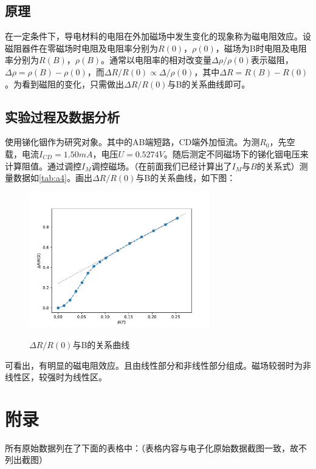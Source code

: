 \documentclass[12pt]{article}
\begin{document}
\subsection{原理}
在一定条件下，导电材料的电阻在外加磁场中发生变化的现象称为磁电阻效应。设磁阻器件在零磁场时电阻及电阻率分别为$R(0)$，$\rho (0)$，磁场为B时电阻及电阻率分别为$R(B)$，$\rho (B)$。通常以电阻率的相对改变量$\Delta \rho / \rho(0)$表示磁阻，$\Delta \rho=\rho(B)−\rho(0)$，而$\Delta R / R(0) \propto \Delta / \rho(0)$，其中$\Delta R=R(B)−R(0)$。为看到磁阻的变化，只需做出$\Delta R / R(0)$与B的关系曲线即可。

\subsection{实验过程及数据分析}
使用锑化铟作为研究对象。其中的AB端短路，CD端外加恒流。为测$R_0$，先空载，电流$I_{CD}=1.50mA$，电压$U=0.5274V$。随后测定不同磁场下的锑化铟电压来计算阻值。通过调控$I_M$调控磁场。（在前面我们已经计算出了$I_M$与$B$的关系式）测量数据如\ref{tab:a4}。画出$\Delta R / R(0)$与B的关系曲线，如下图：

\begin{figure}[H]
    \centering
    \includegraphics[width=0.7\textwidth]{part4.pdf}
    \label{fig:4}
    \caption{$\Delta R / R(0)$与B的关系曲线}
\end{figure}

可看出，有明显的磁电阻效应。且由线性部分和非线性部分组成。磁场较弱时为非线性区，较强时为线性区。

\clearpage

\appendix
\section{附录}
\renewcommand{\thetable}{附表\arabic{table}}
\setcounter{table}{0}

所有原始数据列在了下面的表格中：（表格内容与电子化原始数据截图一致，故不列出截图）
\end{document}
